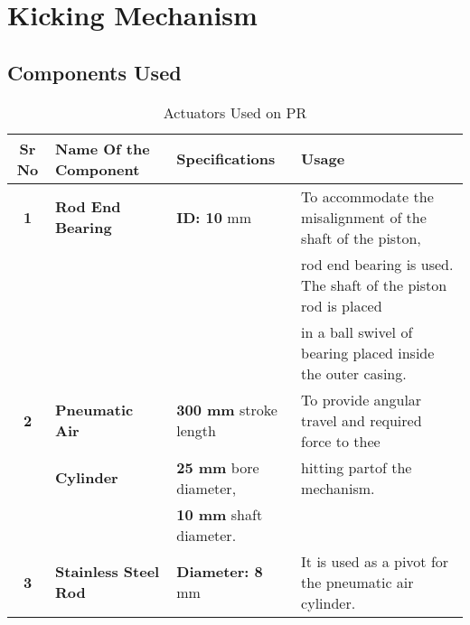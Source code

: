 
\section{Kicking Mechanism}
    \subsection{Components Used}
    \begin{table}[h]
        \caption {Actuators Used on PR} \label{Actuators_PR}  \small
        \begin{tabular}{|c|l|l|l|}
            \hline  \hline
            \textbf{Sr No}  & \textbf{Name Of the Component}& \textbf{Specifications}               & \textbf{Usage}                                                   \\ \hline    \hline
            \textbf{1}      & \textbf{Rod End Bearing}      & \textbf{ID: 10 }mm                    & To accommodate the misalignment of the shaft of the piston,      \\
                            &                               &                                       & rod end bearing is used. The shaft of the piston rod is placed   \\ 
                            &                               &                                       & in a ball swivel of bearing placed inside the outer casing.      \\ \hline
            \textbf{2}      & \textbf{Pneumatic Air}        & \textbf{300 mm} stroke length         & To provide angular travel and required force to thee             \\
                            & \textbf{Cylinder}             & \textbf{25 mm} bore diameter,         & hitting partof the mechanism.                                    \\  
                            &                               & \textbf{10 mm} shaft diameter.        &                                                                  \\ \hline
            \textbf{3}      & \textbf{Stainless Steel Rod}  & \textbf{Diameter: 8} mm               & It is used as a pivot for the pneumatic air cylinder.            \\

\end{tabular}
\end{table}
